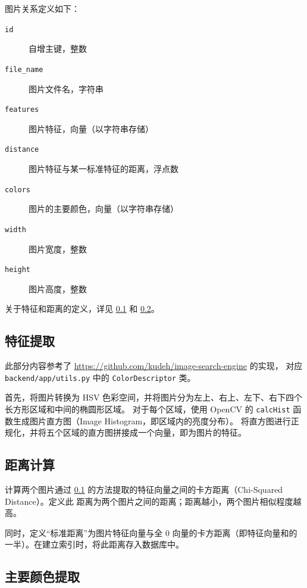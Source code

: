 \documentclass[a4paper]{article}
\begin{document}
图片关系定义如下：

\begin{description}
    \item[\texttt{id}] 自增主键，整数
    \item[\texttt{file\_name}] 图片文件名，字符串
    \item[\texttt{features}] 图片特征，向量（以字符串存储）
    \item[\texttt{distance}] 图片特征与某一标准特征的距离，浮点数
    \item[\texttt{colors}] 图片的主要颜色，向量（以字符串存储）
    \item[\texttt{width}] 图片宽度，整数
    \item[\texttt{height}] 图片高度，整数
\end{description}

关于特征和距离的定义，详见 \ref{sec:feature-extraction} 和 \ref{sec:distance-calculation}。

\subsection{特征提取}\label{sec:feature-extraction}

此部分内容参考了 \hyperlink{image-search-engine}{https://github.com/kudeh/image-search-engine} 的实现，
对应 \texttt{backend/app/utils.py} 中的 \texttt{ColorDescriptor} 类。

首先，将图片转换为 HSV 色彩空间，并将图片分为左上、右上、左下、右下四个长方形区域和中间的椭圆形区域。
对于每个区域，使用 OpenCV 的 \texttt{calcHist} 函数生成图片直方图（Image Histogram，即区域内的亮度分布）。
将直方图进行正规化，并将五个区域的直方图拼接成一个向量，即为图片的特征。

\subsection{距离计算}\label{sec:distance-calculation}

计算两个图片通过 \ref{sec:feature-extraction} 的方法提取的特征向量之间的卡方距离（Chi-Squared Distance）。定义此
距离为两个图片之间的距离；距离越小，两个图片相似程度越高。

同时，定义“标准距离”为图片特征向量与全 0 向量的卡方距离（即特征向量和的一半）。在建立索引时，将此距离存入数据库中。

\subsection{主要颜色提取}
\end{document}

